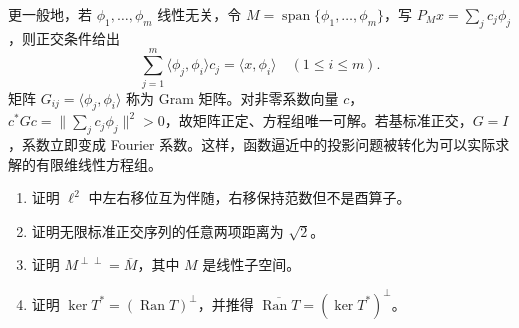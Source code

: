 更一般地，若 $\phi_1,\ldots,\phi_m$ 线性无关，令 $M=\operatorname{span}\{\phi_1,\ldots,\phi_m\}$，写 $P_Mx=\sum_jc_j\phi_j$，则正交条件给出
\[
 \sum_{j=1}^m\langle\phi_j,\phi_i\rangle c_j=\langle x,\phi_i\rangle
 \quad(1\leq i\leq m).
\]
矩阵 $G_{ij}=\langle\phi_j,\phi_i\rangle$ 称为 Gram 矩阵。对非零系数向量 $c$，$c^*Gc=\|\sum_jc_j\phi_j\|^2>0$，故矩阵正定、方程组唯一可解。若基标准正交，$G=I$，系数立即变成 Fourier 系数。这样，函数逼近中的投影问题被转化为可以实际求解的有限维线性方程组。
\begin{enumerate}
 \item\label{exer:fa-shift-adjoint} 证明 $\ell^2$ 中左右移位互为伴随，右移保持范数但不是酉算子。
 \item 证明无限标准正交序列的任意两项距离为 $\sqrt2$。
 \item\label{exer:fa-double-perp} 证明 $M^{\perp\perp}=\overline M$，其中 $M$ 是线性子空间。
 \item 证明 $\ker T^*=(\operatorname{Ran}T)^\perp$，并推得 $\overline{\operatorname{Ran}T}=(\ker T^*)^\perp$。
\end{enumerate}

